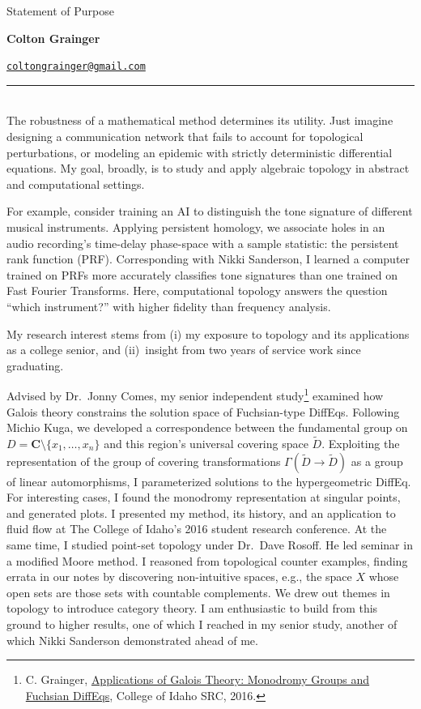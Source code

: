 \documentclass{article}
\makeatletter
\newcommand\textbox[1]{\parbox{.33\textwidth}{#1}}
\newcommand\printheader{\noindent
  \textbox{Statement of Purpose}
  \textbox{\centerline{\large\bf Colton Grainger}}
  \textbox{\raggedleft \href{mailto:coltongrainger@gmail.com}{\texttt{coltongrainger@gmail.com}}\ }

  \vspace{-15pt}
  \noindent
  \rule{\textwidth}{1pt}\\
}
\makeatother
\begin{document}
 

\printheader

The robustness of a mathematical method determines its utility. Just
imagine designing a communication network that fails to account for
topological perturbations, or modeling an epidemic with strictly
deterministic differential equations. My goal, broadly, is to study and
apply algebraic topology in abstract and computational settings. 

For example, consider training an AI to distinguish the tone signature
of different musical instruments. Applying persistent homology, we
associate holes in an audio recording's time-delay phase-space with a
sample statistic: the persistent rank function (PRF). Corresponding with Nikki
Sanderson, I learned a computer trained on PRFs more
accurately classifies tone signatures than one trained on Fast Fourier Transforms. 
Here, computational topology answers the question ``which instrument?'' with higher 
fidelity than frequency analysis.

My research interest stems from (i) my exposure to topology and its
applications as a college senior, and (ii)~insight from two years of
service work since graduating.

Advised by Dr.~Jonny Comes, my senior independent study\footnote{C.
  Grainger,
  \href{http://coltongrainger.com/documents/cgrainger_coursework_galois_poster.pdf}{Applications
  of Galois Theory: Monodromy Groups and Fuchsian DiffEqs}, College of Idaho SRC, 2016.}
examined how Galois theory constrains the solution space of
Fuchsian-type DiffEqs. Following Michio Kuga, we developed a
correspondence between the fundamental group on
\(D = \mathbf{C}\setminus\{x_1,\ldots,x_n\}\) and this region's
universal covering space \(\tilde{D}\). Exploiting the representation of
the group of covering transformations
\(\Gamma(\tilde{D} \to \tilde{D})\) as a group of linear automorphisms,
I parameterized solutions to the hypergeometric DiffEq. For
interesting cases, I found the monodromy representation at singular
points, and generated plots. I presented my method, its history, and an
application to fluid flow at The College of Idaho's 2016 student
research conference. At the same time, I studied point-set topology
under Dr.~Dave Rosoff. He led seminar in a modified Moore method.
I reasoned from topological counter examples, finding errata in our notes by
discovering non-intuitive spaces, e.g., the space \(X\) whose
open sets are those sets with countable complements.
We drew out themes in topology to introduce category theory.
I am enthusiastic to build from this ground to higher results,
one of which I reached in my senior study, another of which Nikki
Sanderson demonstrated ahead of me.
\end{document}
